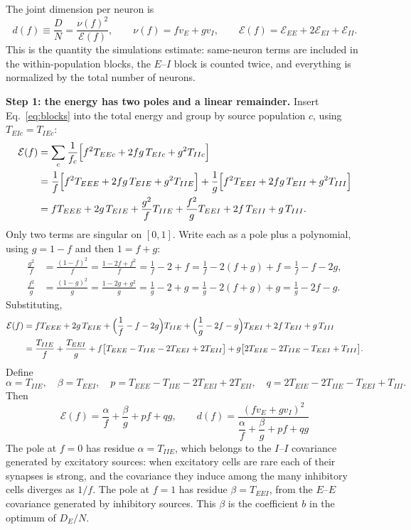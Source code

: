 \documentclass[11pt]{article}
\newcommand{\energy}{\mathcal E}
\begin{document}
The joint dimension per neuron is
\begin{equation}
 d(f)\equiv\frac DN=\frac{\nu(f)^2}{\energy(f)},\qquad
 \nu(f)=fv_E+gv_I,\qquad
 \energy(f)=\energy_{EE}+2\energy_{EI}+\energy_{II}.
 \label{eq:d}
\end{equation}
This is the quantity the simulations estimate: same-neuron terms are included in the within-population blocks, the $E$--$I$ block is counted twice, and everything is normalized by the total number of neurons.

\textbf{Step 1: the energy has two poles and a linear remainder.} Insert Eq.~\eqref{eq:blocks} into the total energy and group by source population $c$, using $T_{EIc}=T_{IEc}$:
\begin{align*}
 \energy(f)
 &=\sum_{c}\frac1{f_c}\Bigl[f^2T_{EEc}+2fg\,T_{EIc}+g^2T_{IIc}\Bigr]\\
 &=\frac1f\Bigl[f^2T_{EEE}+2fg\,T_{EIE}+g^2T_{IIE}\Bigr]
  +\frac1g\Bigl[f^2T_{EEI}+2fg\,T_{EII}+g^2T_{III}\Bigr]\\
 &=fT_{EEE}+2g\,T_{EIE}+\frac{g^2}{f}T_{IIE}
  +\frac{f^2}{g}T_{EEI}+2f\,T_{EII}+g\,T_{III}.
\end{align*}
Only two terms are singular on $[0,1]$. Write each as a pole plus a polynomial, using $g=1-f$ and then $1=f+g$:
\begin{align*}
 \frac{g^2}{f}&=\frac{(1-f)^2}{f}=\frac{1-2f+f^2}{f}=\frac1f-2+f=\frac1f-2(f+g)+f=\frac1f-f-2g,\\
 \frac{f^2}{g}&=\frac{(1-g)^2}{g}=\frac{1-2g+g^2}{g}=\frac1g-2+g=\frac1g-2(f+g)+g=\frac1g-2f-g.
\end{align*}
Substituting,
\begin{align*}
 \energy(f)
 &=fT_{EEE}+2g\,T_{EIE}+\Bigl(\frac1f-f-2g\Bigr)T_{IIE}
  +\Bigl(\frac1g-2f-g\Bigr)T_{EEI}+2f\,T_{EII}+g\,T_{III}\\
 &=\frac{T_{IIE}}{f}+\frac{T_{EEI}}{g}
  +f\bigl[T_{EEE}-T_{IIE}-2T_{EEI}+2T_{EII}\bigr]
  +g\bigl[2T_{EIE}-2T_{IIE}-T_{EEI}+T_{III}\bigr].
\end{align*}
Define
\begin{equation}
 \alpha=T_{IIE},\quad\beta=T_{EEI},\quad
 p=T_{EEE}-T_{IIE}-2T_{EEI}+2T_{EII},\quad
 q=2T_{EIE}-2T_{IIE}-T_{EEI}+T_{III}.
 \label{eq:coefficients}
\end{equation}
Then
\begin{equation}
 \boxed{\;\energy(f)=\frac{\alpha}{f}+\frac{\beta}{g}+pf+qg,\qquad
 d(f)=\frac{(fv_E+gv_I)^2}{\dfrac{\alpha}{f}+\dfrac{\beta}{g}+pf+qg}\;}
 \label{eq:reduced}
\end{equation}
The pole at $f=0$ has residue $\alpha=T_{IIE}$, which belongs to the $I$--$I$ covariance generated by excitatory sources: when excitatory cells are rare each of their synapses is strong, and the covariance they induce among the many inhibitory cells diverges as $1/f$. The pole at $f=1$ has residue $\beta=T_{EEI}$, from the $E$--$E$ covariance generated by inhibitory sources. This $\beta$ is the coefficient $b$ in the optimum of $D_E/N$.
\end{document}
